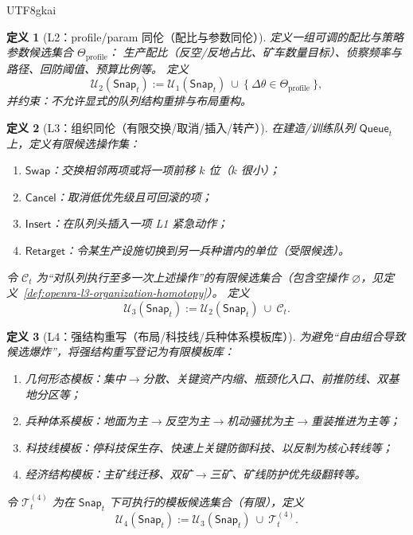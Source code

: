 \documentclass[12pt]{article}
\newtheorem{definition}{定义}[section]
\begin{document}
\begin{CJK*}{UTF8}{gkai}
\begin{definition}[L2：profile/param 同伦（配比与参数同伦）]
\label{def:openra-gen-l2}
定义一组可调的配比与策略参数候选集合 $\Theta_{\mathrm{profile}}$：
生产配比（反空/反地占比、矿车数量目标）、侦察频率与路径、回防阈值、预算比例等。
定义
\[
  \mathcal{U}_2(\mathsf{Snap}_t)
  :=
  \mathcal{U}_1(\mathsf{Snap}_t)\ \cup\ \{\ \Delta\theta\in\Theta_{\mathrm{profile}}\ \},
\]
并约束：不允许显式的队列结构重排与布局重构。
\end{definition}

\begin{definition}[L3：组织同伦（有限交换/取消/插入/转产）]
\label{def:openra-gen-l3}
在建造/训练队列 $\mathsf{Queue}_t$ 上，定义有限候选操作集：
\begin{enumerate}
  \item $\mathsf{Swap}$：交换相邻两项或将一项前移 $k$ 位（$k$ 很小）；
  \item $\mathsf{Cancel}$：取消低优先级且可回滚的项；
  \item $\mathsf{Insert}$：在队列头插入一项 L1 紧急动作；
  \item $\mathsf{Retarget}$：令某生产设施切换到另一兵种谱内的单位（受限候选）。
\end{enumerate}
令 $\mathcal{C}_t$ 为“对队列执行至多一次上述操作”的有限候选集合（包含空操作 $\varnothing$，见定义~\ref{def:openra-l3-organization-homotopy}）。
定义
\[
  \mathcal{U}_3(\mathsf{Snap}_t)
  :=
  \mathcal{U}_2(\mathsf{Snap}_t)\ \cup\ \mathcal{C}_t.
\]
\end{definition}

\begin{definition}[L4：强结构重写（布局/科技线/兵种体系模板库）]
\label{def:openra-gen-l4}
为避免“自由组合导致候选爆炸”，将强结构重写登记为有限模板库：
\begin{enumerate}
  \item 几何形态模板：集中$\to$分散、关键资产内缩、瓶颈化入口、前推防线、双基地分区等；
  \item 兵种体系模板：地面为主$\to$反空为主$\to$机动骚扰为主$\to$重装推进为主等；
  \item 科技线模板：停科技保生存、快速上关键防御科技、以反制为核心转线等；
  \item 经济结构模板：主矿线迁移、双矿$\to$三矿、矿线防护优先级翻转等。
\end{enumerate}
令 $\mathcal{T}^{(4)}_t$ 为在 $\mathsf{Snap}_t$ 下可执行的模板候选集合（有限），定义
\[
  \mathcal{U}_4(\mathsf{Snap}_t)
  :=
  \mathcal{U}_3(\mathsf{Snap}_t)\ \cup\ \mathcal{T}^{(4)}_t.
\]
\end{definition}


\end{CJK*}
\end{document}
